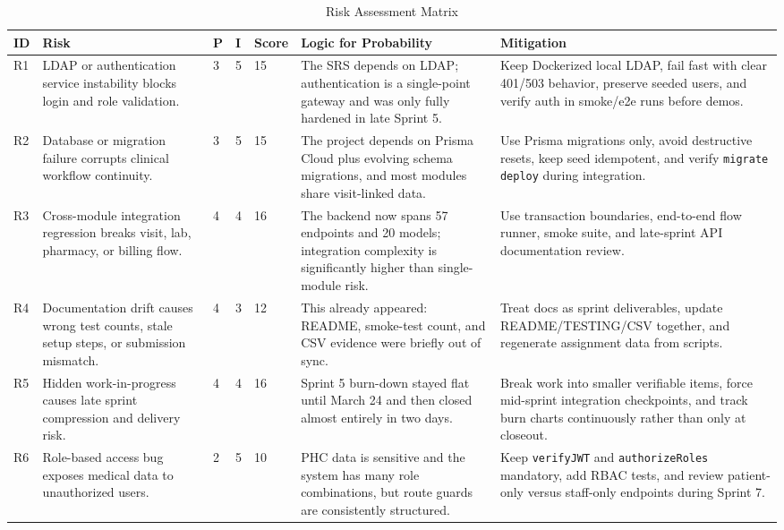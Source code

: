 \documentclass[conference]{IEEEtran}
\begin{document}
\begin{table}[t]
\caption{Risk Assessment Matrix}
\centering
\footnotesize
\begin{tabular}{p{0.75cm} p{3.35cm} p{0.8cm} p{0.8cm} p{0.95cm} p{4.7cm} p{4.25cm}}
\hline
\rowcolor{HeaderBlue}
\textbf{ID} & \textbf{Risk} & \textbf{P} & \textbf{I} & \textbf{Score} & \textbf{Logic for Probability} & \textbf{Mitigation} \\
\hline
R1 & LDAP or authentication service instability blocks login and role validation. & 3 & 5 & 15 & The SRS depends on LDAP; authentication is a single-point gateway and was only fully hardened in late Sprint 5. & Keep Dockerized local LDAP, fail fast with clear 401/503 behavior, preserve seeded users, and verify auth in smoke/e2e runs before demos. \\
R2 & Database or migration failure corrupts clinical workflow continuity. & 3 & 5 & 15 & The project depends on Prisma Cloud plus evolving schema migrations, and most modules share visit-linked data. & Use Prisma migrations only, avoid destructive resets, keep seed idempotent, and verify \texttt{migrate deploy} during integration. \\
R3 & Cross-module integration regression breaks visit, lab, pharmacy, or billing flow. & 4 & 4 & 16 & The backend now spans 57 endpoints and 20 models; integration complexity is significantly higher than single-module risk. & Use transaction boundaries, end-to-end flow runner, smoke suite, and late-sprint API documentation review. \\
R4 & Documentation drift causes wrong test counts, stale setup steps, or submission mismatch. & 4 & 3 & 12 & This already appeared: README, smoke-test count, and CSV evidence were briefly out of sync. & Treat docs as sprint deliverables, update README/TESTING/CSV together, and regenerate assignment data from scripts. \\
R5 & Hidden work-in-progress causes late sprint compression and delivery risk. & 4 & 4 & 16 & Sprint 5 burn-down stayed flat until March 24 and then closed almost entirely in two days. & Break work into smaller verifiable items, force mid-sprint integration checkpoints, and track burn charts continuously rather than only at closeout. \\
R6 & Role-based access bug exposes medical data to unauthorized users. & 2 & 5 & 10 & PHC data is sensitive and the system has many role combinations, but route guards are consistently structured. & Keep \texttt{verifyJWT} and \texttt{authorizeRoles} mandatory, add RBAC tests, and review patient-only versus staff-only endpoints during Sprint 7. \\

\end{tabular}
\end{table}
\end{document}
